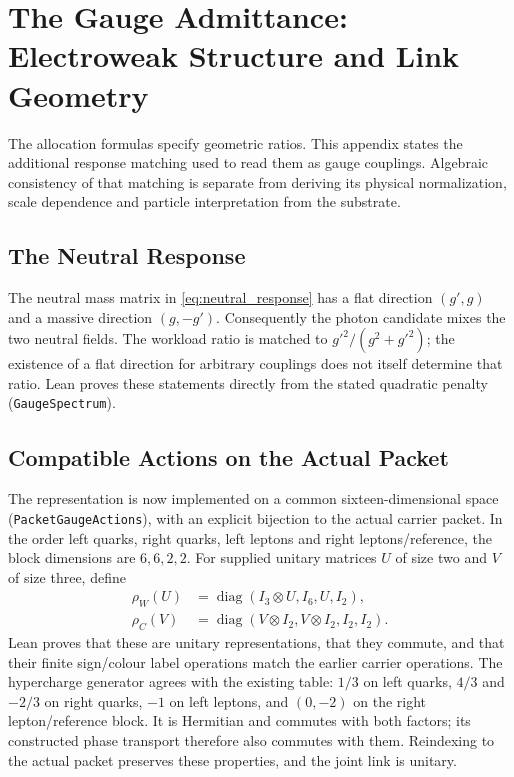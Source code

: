 \section{The Gauge Admittance: Electroweak Structure and Link Geometry}
\label{app:gauge_admittance}

The allocation formulas specify geometric ratios. This appendix states the additional response matching used to read them as gauge couplings. Algebraic consistency of that matching is separate from deriving its physical normalization, scale dependence and particle interpretation from the substrate.

\subsection{The Neutral Response}

The neutral mass matrix in \cref{eq:neutral_response} has a flat direction $(g',g)$ and a massive direction $(g,-g')$. Consequently the photon candidate mixes the two neutral fields. The workload ratio is matched to $g'^2/(g^2+g'^2)$; the existence of a flat direction for arbitrary couplings does not itself determine that ratio. Lean proves these statements directly from the stated quadratic penalty (\texttt{GaugeSpectrum}).

\subsection{Compatible Actions on the Actual Packet}

The representation is now implemented on a common sixteen-dimensional space (\texttt{PacketGaugeActions}), with an explicit bijection to the actual carrier packet. In the order left quarks, right quarks, left leptons and right leptons/reference, the block dimensions are $6,6,2,2$. For supplied unitary matrices $U$ of size two and $V$ of size three, define
\begin{align}
 \rho_W(U)&=\operatorname{diag}(I_3\otimes U,I_6,U,I_2),\\
 \rho_C(V)&=\operatorname{diag}(V\otimes I_2,V\otimes I_2,I_2,I_2).
\end{align}
Lean proves that these are unitary representations, that they commute, and that their finite sign/colour label operations match the earlier carrier operations. The hypercharge generator agrees with the existing table: $1/3$ on left quarks, $4/3$ and $-2/3$ on right quarks, $-1$ on left leptons, and $(0,-2)$ on the right lepton/reference block. It is Hermitian and commutes with both factors; its constructed phase transport therefore also commutes with them. Reindexing to the actual packet preserves these properties, and the joint link is unitary.

